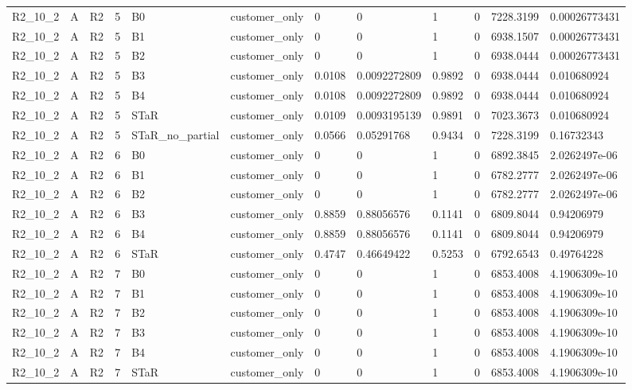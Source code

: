 \begin{longtable}{llllllllllll}
R2\_10\_2 & A & R2 & 5 & B0 & customer\_only & 0 & 0 & 1 & 0 & 7228.3199 & 0.00026773431 \\
R2\_10\_2 & A & R2 & 5 & B1 & customer\_only & 0 & 0 & 1 & 0 & 6938.1507 & 0.00026773431 \\
R2\_10\_2 & A & R2 & 5 & B2 & customer\_only & 0 & 0 & 1 & 0 & 6938.0444 & 0.00026773431 \\
R2\_10\_2 & A & R2 & 5 & B3 & customer\_only & 0.0108 & 0.0092272809 & 0.9892 & 0 & 6938.0444 & 0.010680924 \\
R2\_10\_2 & A & R2 & 5 & B4 & customer\_only & 0.0108 & 0.0092272809 & 0.9892 & 0 & 6938.0444 & 0.010680924 \\
R2\_10\_2 & A & R2 & 5 & STaR & customer\_only & 0.0109 & 0.0093195139 & 0.9891 & 0 & 7023.3673 & 0.010680924 \\
R2\_10\_2 & A & R2 & 5 & STaR\_no\_partial & customer\_only & 0.0566 & 0.05291768 & 0.9434 & 0 & 7228.3199 & 0.16732343 \\
R2\_10\_2 & A & R2 & 6 & B0 & customer\_only & 0 & 0 & 1 & 0 & 6892.3845 & 2.0262497e-06 \\
R2\_10\_2 & A & R2 & 6 & B1 & customer\_only & 0 & 0 & 1 & 0 & 6782.2777 & 2.0262497e-06 \\
R2\_10\_2 & A & R2 & 6 & B2 & customer\_only & 0 & 0 & 1 & 0 & 6782.2777 & 2.0262497e-06 \\
R2\_10\_2 & A & R2 & 6 & B3 & customer\_only & 0.8859 & 0.88056576 & 0.1141 & 0 & 6809.8044 & 0.94206979 \\
R2\_10\_2 & A & R2 & 6 & B4 & customer\_only & 0.8859 & 0.88056576 & 0.1141 & 0 & 6809.8044 & 0.94206979 \\
R2\_10\_2 & A & R2 & 6 & STaR & customer\_only & 0.4747 & 0.46649422 & 0.5253 & 0 & 6792.6543 & 0.49764228 \\
R2\_10\_2 & A & R2 & 7 & B0 & customer\_only & 0 & 0 & 1 & 0 & 6853.4008 & 4.1906309e-10 \\
R2\_10\_2 & A & R2 & 7 & B1 & customer\_only & 0 & 0 & 1 & 0 & 6853.4008 & 4.1906309e-10 \\
R2\_10\_2 & A & R2 & 7 & B2 & customer\_only & 0 & 0 & 1 & 0 & 6853.4008 & 4.1906309e-10 \\
R2\_10\_2 & A & R2 & 7 & B3 & customer\_only & 0 & 0 & 1 & 0 & 6853.4008 & 4.1906309e-10 \\
R2\_10\_2 & A & R2 & 7 & B4 & customer\_only & 0 & 0 & 1 & 0 & 6853.4008 & 4.1906309e-10 \\
R2\_10\_2 & A & R2 & 7 & STaR & customer\_only & 0 & 0 & 1 & 0 & 6853.4008 & 4.1906309e-10 \\

\end{longtable}
